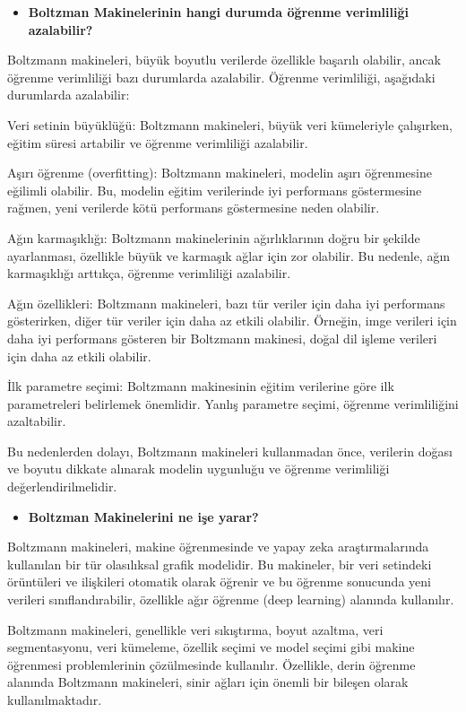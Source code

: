 \documentclass[11pt]{article}
\begin{document}
\begin{itemize}
    \item \textbf{Boltzman Makinelerinin hangi durumda öğrenme verimliliği azalabilir?}
\end{itemize}

Boltzmann makineleri, büyük boyutlu verilerde özellikle başarılı olabilir, ancak öğrenme verimliliği bazı durumlarda azalabilir. Öğrenme verimliliği, aşağıdaki durumlarda azalabilir:

Veri setinin büyüklüğü: Boltzmann makineleri, büyük veri kümeleriyle çalışırken, eğitim süresi artabilir ve öğrenme verimliliği azalabilir.

Aşırı öğrenme (overfitting): Boltzmann makineleri, modelin aşırı öğrenmesine eğilimli olabilir. Bu, modelin eğitim verilerinde iyi performans göstermesine rağmen, yeni verilerde kötü performans göstermesine neden olabilir.

Ağın karmaşıklığı: Boltzmann makinelerinin ağırlıklarının doğru bir şekilde ayarlanması, özellikle büyük ve karmaşık ağlar için zor olabilir. Bu nedenle, ağın karmaşıklığı arttıkça, öğrenme verimliliği azalabilir.

Ağın özellikleri: Boltzmann makineleri, bazı tür veriler için daha iyi performans gösterirken, diğer tür veriler için daha az etkili olabilir. Örneğin, imge verileri için daha iyi performans gösteren bir Boltzmann makinesi, doğal dil işleme verileri için daha az etkili olabilir.

İlk parametre seçimi: Boltzmann makinesinin eğitim verilerine göre ilk parametreleri belirlemek önemlidir. Yanlış parametre seçimi, öğrenme verimliliğini azaltabilir.

Bu nedenlerden dolayı, Boltzmann makineleri kullanmadan önce, verilerin doğası ve boyutu dikkate alınarak modelin uygunluğu ve öğrenme verimliliği değerlendirilmelidir.

\begin{itemize}
    \item \textbf{Boltzman Makinelerini ne işe yarar?}
\end{itemize}

Boltzmann makineleri, makine öğrenmesinde ve yapay zeka araştırmalarında kullanılan bir tür olasılıksal grafik modelidir. Bu makineler, bir veri setindeki örüntüleri ve ilişkileri otomatik olarak öğrenir ve bu öğrenme sonucunda yeni verileri sınıflandırabilir, özellikle ağır öğrenme (deep learning) alanında kullanılır.

Boltzmann makineleri, genellikle veri sıkıştırma, boyut azaltma, veri segmentasyonu, veri kümeleme, özellik seçimi ve model seçimi gibi makine öğrenmesi problemlerinin çözülmesinde kullanılır. Özellikle, derin öğrenme alanında Boltzmann makineleri, sinir ağları için önemli bir bileşen olarak kullanılmaktadır.
\end{document}
